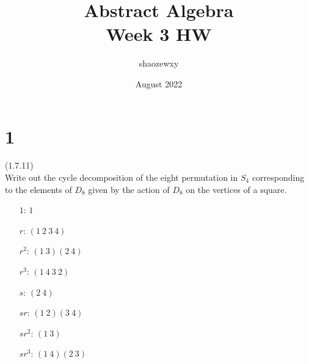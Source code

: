 \documentclass{article}
\title{Abstract Algebra\\
\large{Week 3 HW}}
\author{shaozewxy }
\date{August 2022}
\begin{document}
\maketitle

\setcounter{secnumdepth}{0}
\section*{1}
(1.7.11)\\
Write out the cycle decomposition of the eight permutation in $S_4$ corresponding to the elements of $D_8$ given by the action of $D_8$ on the vertices of a square.
\begin{itemize}
    \item[$1$:] $1$
    \item[$r$:] $(1\ 2\ 3\ 4)$
    \item[$r^2$:] $(1\ 3)(2\ 4)$
    \item[$r^3$:] $(1\ 4\ 3\ 2)$
    \item[$s$:] $(2\ 4)$
    \item[$sr$:] $(1\ 2)(3\ 4)$
    \item[$sr^2$:] $(1\ 3)$
    \item[$sr^3$:] $(1\ 4)(2\ 3)$
\end{itemize}
\end{document}
